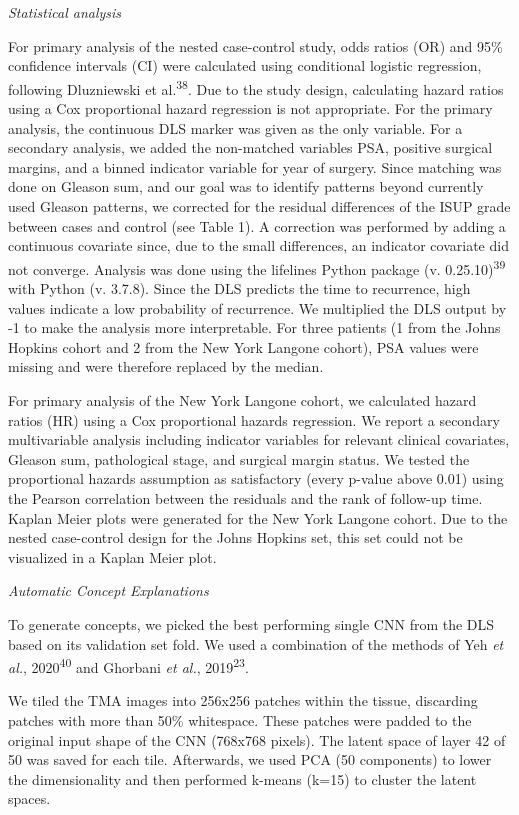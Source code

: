 \documentclass[
  12pt,
  a5,margin=2cmpaper,
]{article}
\begin{document}
\emph{Statistical analysis}

For primary analysis of the nested case-control study, odds ratios (OR)
and 95\% confidence intervals (CI) were calculated using conditional
logistic regression, following Dluzniewski et al.\textsuperscript{38}.
Due to the study design, calculating hazard ratios using a Cox
proportional hazard regression is not appropriate. For the primary
analysis, the continuous DLS marker was given as the only variable. For
a secondary analysis, we added the non-matched variables PSA, positive
surgical margins, and a binned indicator variable for year of surgery.
Since matching was done on Gleason sum, and our goal was to identify
patterns beyond currently used Gleason patterns, we corrected for the
residual differences of the ISUP grade between cases and control (see
Table 1). A correction was performed by adding a continuous covariate
since, due to the small differences, an indicator covariate did not
converge. Analysis was done using the lifelines Python package (v.
0.25.10)\textsuperscript{39} with Python (v. 3.7.8). Since the DLS
predicts the time to recurrence, high values indicate a low probability
of recurrence. We multiplied the DLS output by -1 to make the analysis
more interpretable. For three patients (1 from the Johns Hopkins cohort
and 2 from the New York Langone cohort), PSA values were missing and
were therefore replaced by the median.

For primary analysis of the New York Langone cohort, we calculated
hazard ratios (HR) using a Cox proportional hazards regression. We
report a secondary multivariable analysis including indicator variables
for relevant clinical covariates, Gleason sum, pathological stage, and
surgical margin status. We tested the proportional hazards assumption as
satisfactory (every p-value above 0.01) using the Pearson correlation
between the residuals and the rank of follow-up time. Kaplan Meier plots
were generated for the New York Langone cohort. Due to the nested
case-control design for the Johns Hopkins set, this set could not be
visualized in a Kaplan Meier plot.

\emph{Automatic Concept Explanations}

To generate concepts, we picked the best performing single CNN from the
DLS based on its validation set fold. We used a combination of the
methods of Yeh \emph{et al.}, 2020\textsuperscript{40} and Ghorbani
\emph{et al.}, 2019\textsuperscript{23}.

We tiled the TMA images into 256x256 patches within the tissue,
discarding patches with more than 50\% whitespace. These patches were
padded to the original input shape of the CNN (768x768 pixels). The
latent space of layer 42 of 50 was saved for each tile. Afterwards, we
used PCA (50 components) to lower the dimensionality and then performed
k-means (k=15) to cluster the latent spaces.
\end{document}
